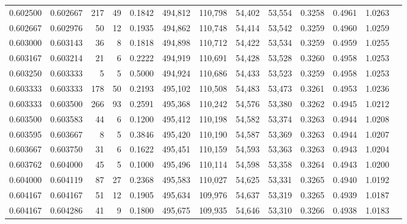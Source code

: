 \begin{tabular}{rrrrrrrrrrrrr}
0.602500 & 0.602667 &   217 &  49 &                                     0.1842 & 494,812 & 110,798 &  54,402 &  53,554 & 0.3258 & 0.4961 & 1.0263 \\
0.602667 & 0.602976 &    50 &  12 &                                     0.1935 & 494,862 & 110,748 &  54,414 &  53,542 & 0.3259 & 0.4960 & 1.0259 \\
0.603000 & 0.603143 &    36 &   8 &                                     0.1818 & 494,898 & 110,712 &  54,422 &  53,534 & 0.3259 & 0.4959 & 1.0255 \\
0.603167 & 0.603214 &    21 &   6 &                                     0.2222 & 494,919 & 110,691 &  54,428 &  53,528 & 0.3260 & 0.4958 & 1.0253 \\
0.603250 & 0.603333 &     5 &   5 &                                     0.5000 & 494,924 & 110,686 &  54,433 &  53,523 & 0.3259 & 0.4958 & 1.0253 \\
0.603333 & 0.603333 &   178 &  50 &                                     0.2193 & 495,102 & 110,508 &  54,483 &  53,473 & 0.3261 & 0.4953 & 1.0236 \\
0.603333 & 0.603500 &   266 &  93 &                                     0.2591 & 495,368 & 110,242 &  54,576 &  53,380 & 0.3262 & 0.4945 & 1.0212 \\
0.603500 & 0.603583 &    44 &   6 &                                     0.1200 & 495,412 & 110,198 &  54,582 &  53,374 & 0.3263 & 0.4944 & 1.0208 \\
0.603595 & 0.603667 &     8 &   5 &                                     0.3846 & 495,420 & 110,190 &  54,587 &  53,369 & 0.3263 & 0.4944 & 1.0207 \\
0.603667 & 0.603750 &    31 &   6 &                                     0.1622 & 495,451 & 110,159 &  54,593 &  53,363 & 0.3263 & 0.4943 & 1.0204 \\
0.603762 & 0.604000 &    45 &   5 &                                     0.1000 & 495,496 & 110,114 &  54,598 &  53,358 & 0.3264 & 0.4943 & 1.0200 \\
0.604000 & 0.604119 &    87 &  27 &                                     0.2368 & 495,583 & 110,027 &  54,625 &  53,331 & 0.3265 & 0.4940 & 1.0192 \\
0.604167 & 0.604167 &    51 &  12 &                                     0.1905 & 495,634 & 109,976 &  54,637 &  53,319 & 0.3265 & 0.4939 & 1.0187 \\
0.604167 & 0.604286 &    41 &   9 &                                     0.1800 & 495,675 & 109,935 &  54,646 &  53,310 & 0.3266 & 0.4938 & 1.0183 \\

\end{tabular}
